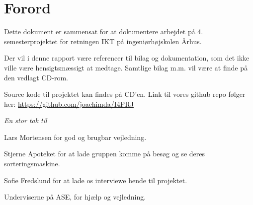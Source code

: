 \chapter{Forord}


Dette dokument er sammensat for at dokumentere arbejdet på 4. semesterprojektet for retningen IKT på ingeniørhøjskolen Århus.

Der vil i denne rapport være referencer til bilag og dokumentation, som det ikke ville være hensigtsmæssigt at medtage. Samtlige bilag m.m. vil være at finde på den vedlagt CD-rom. 

Source kode til projektet kan findes på CD'en. Link til vores github repo følger her: \newline \url{https://github.com/joachimda/I4PRJ}

\vspace{5mm}

\large{\textit{En stor tak til}}

\begin{displayquote}
    Lars Mortensen for god og brugbar vejledning.
\end{displayquote}

\begin{displayquote}
    Stjerne Apoteket for at lade gruppen komme på besøg og se deres sorteringsmaskine.
\end{displayquote}

\begin{displayquote}
    Sofie Fredslund for at lade os interviewe hende til projektet.
\end{displayquote}

\begin{displayquote}
   Underviserne på ASE, for hjælp og vejledning.
\end{displayquote}

